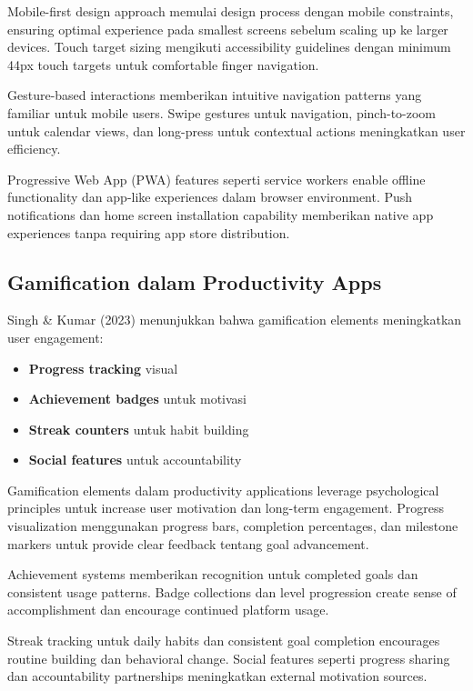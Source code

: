 Mobile-first design approach memulai design process dengan mobile constraints, ensuring optimal experience pada smallest screens sebelum scaling up ke larger devices. Touch target sizing mengikuti accessibility guidelines dengan minimum 44px touch targets untuk comfortable finger navigation.

Gesture-based interactions memberikan intuitive navigation patterns yang familiar untuk mobile users. Swipe gestures untuk navigation, pinch-to-zoom untuk calendar views, dan long-press untuk contextual actions meningkatkan user efficiency.

Progressive Web App (PWA) features seperti service workers enable offline functionality dan app-like experiences dalam browser environment. Push notifications dan home screen installation capability memberikan native app experiences tanpa requiring app store distribution.

\subsection{Gamification dalam Productivity Apps}

Singh \& Kumar (2023) menunjukkan bahwa gamification elements meningkatkan user engagement:

\begin{itemize}
\item \textbf{Progress tracking} visual
\item \textbf{Achievement badges} untuk motivasi
\item \textbf{Streak counters} untuk habit building
\item \textbf{Social features} untuk accountability
\end{itemize}

Gamification elements dalam productivity applications leverage psychological principles untuk increase user motivation dan long-term engagement. Progress visualization menggunakan progress bars, completion percentages, dan milestone markers untuk provide clear feedback tentang goal advancement.

Achievement systems memberikan recognition untuk completed goals dan consistent usage patterns. Badge collections dan level progression create sense of accomplishment dan encourage continued platform usage.

Streak tracking untuk daily habits dan consistent goal completion encourages routine building dan behavioral change. Social features seperti progress sharing dan accountability partnerships meningkatkan external motivation sources.

